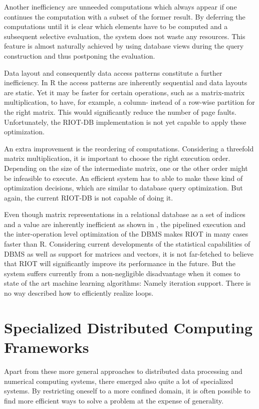 Another inefficiency are unneeded computations which always appear if one continues the computation with a subset of the former result.
By deferring the computations until it is clear which elements have to be computed and a subsequent selective evaluation, the system does not waste any resources.
This feature is almost naturally achieved by using database views during the query construction and thus postponing the evaluation.

Data layout and consequently data access patterns constitute a further inefficiency.
In R the access patterns are inherently sequential and data layouts are static.
Yet it may be faster for certain operations, such as a matrix-matrix multiplication, to have, for example, a column- instead of a row-wise partition for the right matrix.
This would significantly reduce the number of page faults.
Unfortunately, the RIOT-DB implementation is not yet capable to apply these optimization.

An extra improvement is the reordering of computations.
Considering a threefold matrix multiplication, it is important to choose the right execution order.
Depending on the size of the intermediate matrix, one or the other order might be infeasible to execute.
An efficient system has to able to make these kind of optimization decisions, which are similar to database query optimization.
But again, the current RIOT-DB is not capable of doing it.

Even though matrix representations in a relational database as a set of indices and a value are inherently inefficient as shown in \cite{stonebraker:2007a}, the pipelined execution and the inter-operation level optimization of the DBMS makes RIOT in many cases faster than R.
Considering current developments of the statistical capabilities of DBMS as well as support for matrices and vectors, it is not far-fetched to believe that RIOT will significantly improve its performance in the future.
But the system suffers currently from a non-negligible disadvantage when it comes to state of the art machine learning algorithms: Namely iteration support.
There is no way described how to efficiently realize loops.

\section{Specialized Distributed Computing Frameworks}

Apart from these more general approaches to distributed data processing and numerical computing systems, there emerged also quite a lot of specialized systems.
By restricting oneself to a more confined domain, it is often possible to find more efficient ways to solve a problem at the expense of generality.


